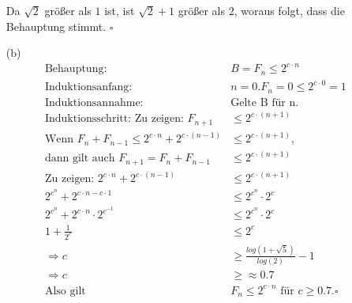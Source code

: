 \documentclass{article}
\begin{document}
\begin{enumerate}
Da $\sqrt{2}$ größer als $1$ ist, ist $\sqrt{2}+1$ größer als $2$, woraus folgt,
dass die Behauptung stimmt. \quad $\square$

\item[(b)]
\begin{align*}
\text{Behauptung: } &B = F_n \le 2^{c \cdot n} \\
\text{Induktionsanfang: } & n = 0. F_n = 0 \le 2^{c \cdot 0} = 1 \\
\text{Induktionsannahme: } &\text{Gelte B für n. } \\
\text{Induktionsschritt: Zu zeigen: } F_{n+1} &\le 2^{c \cdot (n+1)} \\
\text{Wenn } F_n + F_{n-1} \le 2^{c \cdot n} + 2^{c \cdot (n-1)} &\le 2^{c \cdot (n+1)}, \\
\text{dann gilt auch } F_{n+1} = F_n + F_{n-1} &\le 2^{c \cdot (n+1)} \\
\text{Zu zeigen: }  2^{c \cdot n} + 2^{c \cdot (n-1)} &\le 2^{c \cdot (n+1)} \\
2^{c^n} + 2^{c \cdot n - c \cdot 1} &\le 2^{c^n} \cdot 2^c \\
2^{c^n} + 2^{c \cdot n} \cdot 2^{c^{-1}} &\le 2^{c^n} \cdot 2^c \\
1 + \frac{1}{2^c} &\le 2^c \\
\Rightarrow c &\ge \frac{log(1+\sqrt5)}{log(2)} -1 \\
\Rightarrow c &\ge \approx 0.7 \\
\text{Also gilt } &F_n \le 2^{c \cdot n} \text{ für } c \ge 0.7. \square

\end{align*}
\end{enumerate}
\end{document}
